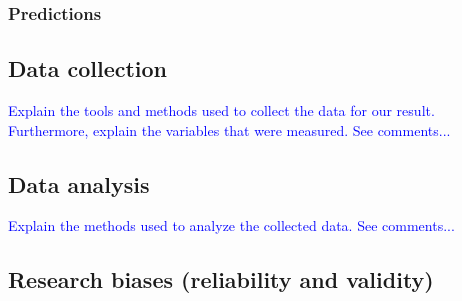 \subsubsection{Predictions}

\subsection{Data collection}
%
%
\textcolor{blue}{Explain the tools and methods used to collect the data for our
result. Furthermore, explain the variables that were measured. See comments...}

\subsection{Data analysis}
%
%
%
\textcolor{blue}{Explain the methods used to analyze the collected data. See comments...}

\subsection{Research biases (reliability and validity)}
%
